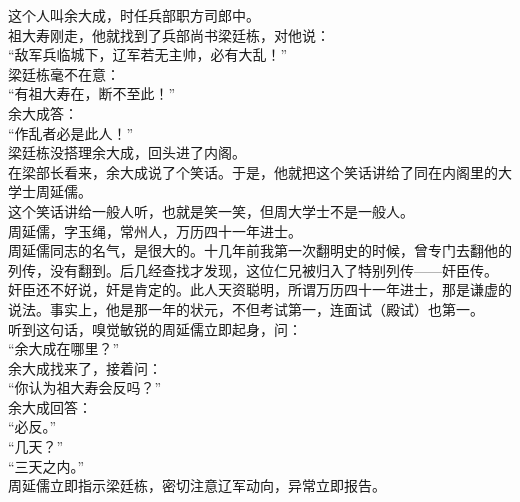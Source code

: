 \begin{multicols}{\theparacolNo}
这个人叫余大成，时任兵部职方司郎中。\\

祖大寿刚走，他就找到了兵部尚书梁廷栋，对他说：\\

“敌军兵临城下，辽军若无主帅，必有大乱！”\\

梁廷栋毫不在意：\\

“有祖大寿在，断不至此！”\\

余大成答：\\

“作乱者必是此人！”\\

梁廷栋没搭理余大成，回头进了内阁。\\

在梁部长看来，余大成说了个笑话。于是，他就把这个笑话讲给了同在内阁里的大学士周延儒。\\

这个笑话讲给一般人听，也就是笑一笑，但周大学士不是一般人。\\

周延儒，字玉绳，常州人，万历四十一年进士。\\

周延儒同志的名气，是很大的。十几年前我第一次翻明史的时候，曾专门去翻他的列传，没有翻到。后几经查找才发现，这位仁兄被归入了特别列传——奸臣传。\\

奸臣还不好说，奸是肯定的。此人天资聪明，所谓万历四十一年进士，那是谦虚的说法。事实上，他是那一年的状元，不但考试第一，连面试（殿试）也第一。\\

听到这句话，嗅觉敏锐的周延儒立即起身，问：\\

“余大成在哪里？”\\

余大成找来了，接着问：\\

“你认为祖大寿会反吗？”\\

余大成回答：\\

“必反。”\\

“几天？”\\

“三天之内。”\\

周延儒立即指示梁廷栋，密切注意辽军动向，异常立即报告。\\


\end{multicols}
